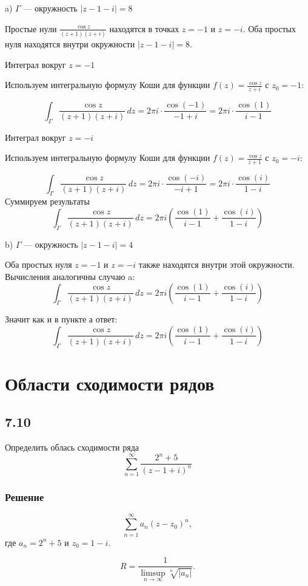 \documentclass[12pt,a4paper]{article}
\begin{document}
a) \(\Gamma\) --- окружность \(|z - 1 - i| = 8\)

Простые нули \( \frac{\cos z}{(z + 1)(z + i)} \) находятся в точках \( z = -1 \) и \( z = -i \). Оба простых нуля находятся внутри окружности \(|z - 1 - i| = 8\).

 Интеграл вокруг \( z = -1 \)

Используем интегральную формулу Коши для функции \( f(z) = \frac{\cos z}{z + i} \) с \( z_0 = -1 \):

\[
\int_{\Gamma} \frac{\cos z}{(z + 1)(z + i)} \, dz = 2\pi i \cdot \frac{\cos(-1)}{-1 + i} = 2\pi i \cdot \frac{\cos(1)}{i - 1}
\]

Интеграл вокруг \( z = -i \)

Используем интегральную формулу Коши для функции \( f(z) = \frac{\cos z}{z + 1} \) с \( z_0 = -i \):

\[
\int_{\Gamma} \frac{\cos z}{(z + 1)(z + i)} \, dz = 2\pi i \cdot \frac{\cos(-i)}{-i + 1} = 2\pi i \cdot \frac{\cos(i)}{1 - i}
\]
Суммируем результаты
\[
\int_{\Gamma} \frac{\cos z}{(z + 1)(z + i)} \, dz = 2\pi i \left( \frac{\cos(1)}{i - 1} + \frac{\cos(i)}{1 - i} \right)
\]

b) \(\Gamma\) --- окружность \(|z - 1 - i| = 4\)

Оба простых нуля \( z = -1 \) и \( z = -i \) также находятся внутри этой окружности. Вычисления аналогичны случаю a:
\[
\int_{\Gamma} \frac{\cos z}{(z + 1)(z + i)} \, dz = 2\pi i \left( \frac{\cos(1)}{i - 1} + \frac{\cos(i)}{1 - i} \right)
\]

Значит как и в пункте а ответ:
\[
\int_{\Gamma} \frac{\cos z}{(z + 1)(z + i)} \, dz = 2\pi i \left( \frac{\cos(1)}{i - 1} + \frac{\cos(i)}{1 - i} \right)
\]
\section{Области сходимости рядов}
\subsection*{7.10}
Определить облась сходимости ряда
\[
\sum_{n=1}^{\infty}\frac{2^n+5}{(z-1+i)^n}
\]

\subsubsection*{Решение}
\[
\sum_{n=1}^{\infty} a_n (z - z_0)^n,
\]
где \( a_n = 2^n + 5 \) и \( z_0 = 1 - i \).


\[
R = \frac{1}{\limsup_{n \to \infty} \sqrt[n]{|a_n|}}.
\]
\end{document}
